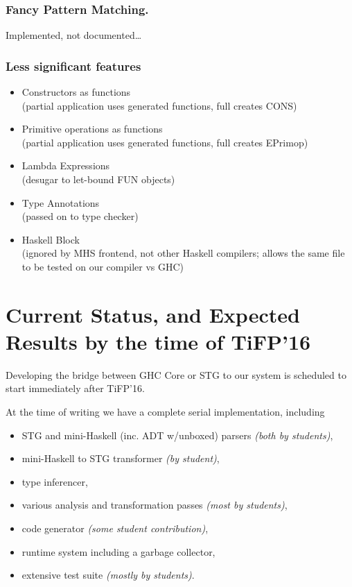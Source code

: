 \documentclass{llncs}
\begin{document}
\subsubsection{Fancy Pattern Matching.}
{\color{red}Implemented, not documented\dots}



\subsubsection{Less significant features}

\begin{itemize}
\item Constructors as functions \\
  (partial application uses generated functions, full creates CONS)

\item Primitive operations as functions \\
  (partial application uses generated functions, full creates EPrimop)

\item Lambda Expressions \\
  (desugar to let-bound FUN objects)

\item Type Annotations \\
  (passed on to type checker)

\item Haskell Block \\
  (ignored by MHS frontend, not other Haskell compilers;
  allows the same file to be tested on our compiler vs GHC)
\end{itemize}


\section{Current Status, and Expected Results by the time of TiFP'16}

Developing the bridge between GHC Core or STG to our system is scheduled
to start immediately after TiFP'16.

At the time of writing we have a complete serial implementation, including
\begin{itemize}
\item STG and mini-Haskell (inc. ADT w/unboxed) parsers \emph{(both by students)},
\item mini-Haskell to STG transformer \emph{(by student)},
\item type inferencer,
\item various analysis and transformation passes \emph{(most by students)},
\item code generator \emph{(some student contribution)},
\item runtime system including a garbage collector,
\item extensive test suite \emph{(mostly by students)}.
\end{itemize}
\end{document}
